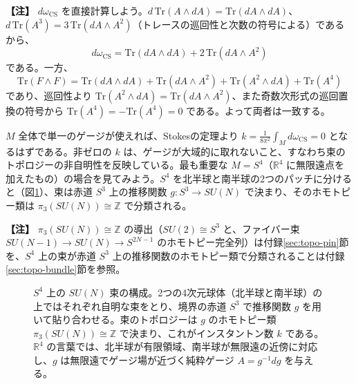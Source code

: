 \documentclass[uplatex, dvipdfmx, book]{jsbook}
\newenvironment{note}{\vspace{1ex}\par\footnotesize\noindent\textbf{【注】}}{\par\vspace{1ex}}
\begin{document}
\begin{note}
$d\omega_{\text{CS}}$ を直接計算しよう。$d\,\mathrm{Tr}(A \wedge dA) = \mathrm{Tr}(dA \wedge dA)$、$d\,\mathrm{Tr}(A^3) = 3\,\mathrm{Tr}(dA \wedge A^2)$（トレースの巡回性と次数の符号による）であるから、
\begin{equation*}
    d\omega_{\text{CS}} = \mathrm{Tr}(dA \wedge dA) + 2\,\mathrm{Tr}(dA \wedge A^2)
\end{equation*}
である。一方、
\begin{equation*}
    \mathrm{Tr}(F \wedge F) = \mathrm{Tr}(dA \wedge dA) + \mathrm{Tr}(dA \wedge A^2) + \mathrm{Tr}(A^2 \wedge dA) + \mathrm{Tr}(A^4)
\end{equation*}
であり、巡回性より $\mathrm{Tr}(A^2 \wedge dA) = \mathrm{Tr}(dA \wedge A^2)$、また奇数次形式の巡回置換の符号から $\mathrm{Tr}(A^4) = -\mathrm{Tr}(A^4) = 0$ である。よって両者は一致する。
\end{note}

$M$ 全体で単一のゲージが使えれば、Stokesの定理より $k = \frac{1}{8\pi^2}\int_M d\omega_{\text{CS}} = 0$ となるはずである。非ゼロの $k$ は、ゲージが大域的に取れないこと、すなわち束のトポロジーの非自明性を反映している。最も重要な $M = S^4$（$\mathbb{R}^4$ に無限遠点を加えたもの）の場合を見てみよう。$S^4$ を北半球と南半球の2つのパッチに分けると（図\ref{fig:S4-gluing}）、束は赤道 $S^3$ 上の推移関数 $g: S^3 \to SU(N)$ で決まり、そのホモトピー類は $\pi_3(SU(N)) \cong \mathbb{Z}$ で分類される。

\begin{note}
$\pi_3(SU(N)) \cong \mathbb{Z}$ の導出（$SU(2) \cong S^3$ と、ファイバー束 $SU(N-1) \to SU(N) \to S^{2N-1}$ のホモトピー完全列）は付録\ref{sec:topo-pin}節を、$S^4$ 上の束が赤道 $S^3$ 上の推移関数のホモトピー類で分類されることは付録\ref{sec:topo-bundle}節を参照。
\end{note}

\begin{figure}[htbp]
\centering
{}
\caption{$S^4$ 上の $SU(N)$ 束の構成。2つの4次元球体（北半球と南半球）の上ではそれぞれ自明な束をとり、境界の赤道 $S^3$ で推移関数 $g$ を用いて貼り合わせる。束のトポロジーは $g$ のホモトピー類 $\pi_3(SU(N)) \cong \mathbb{Z}$ で決まり、これがインスタントン数 $k$ である。$\mathbb{R}^4$ の言葉では、北半球が有限領域、南半球が無限遠の近傍に対応し、$g$ は無限遠でゲージ場が近づく純粋ゲージ $A = g^{-1}dg$ を与える。}
\label{fig:S4-gluing}
\end{figure}
\end{document}
